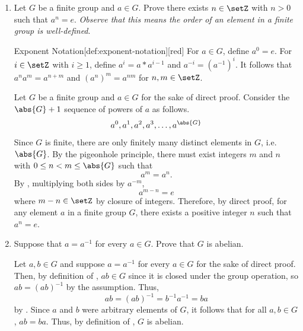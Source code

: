 \begin{enumerate}
  \newpage
  \item Let $G$ be a finite group and $a \in G$. 
  Prove there exists $n \in \setZ$ with $n>0$ such that $a^n=e$.
  \textit{Observe that this means the order of an element in a finite group is well-defined}.
  \begin{define}{Exponent Notation}[def:exponent-notation][red]
    For $a \in G$, define $a^0=e$. 
    For $i \in \setZ$ with $i \geq 1$, 
    define $a^i=a * a^{i-1}$ and $a^{-i}=\left(a^{-1}\right)^i$. 
    It follows that $a^n a^m=a^{n+m}$ and $\left(a^n\right)^m=a^{n m}$ for $n, m \in \setZ$.
  \end{define}
  \begin{subprove}
    Let $G$ be a finite group and $a \in G$ for the sake of direct proof.
    Consider the $\abs{G} + 1$ sequence of powers of $a$ as follows.
    \[
      a^0, a^1, a^2, a^3, \ldots, a^{\abs{G}}
    \]
    Since $G$ is finite, there are only finitely many distinct elements in $G$, i.e. $\abs{G}$.
    By the pigeonhole principle, there must exist integers $m$ and $n$ with $0 \leq n < m \leq \abs{G}$ such that
    \[
      a^m = a^n.
    \]
    By , multiplying both sides by $a^{-m}$,
    \[
      a^{m-n} = e
    \]
    where $m-n \in \setZ$ by closure of integers.
    Therefore, by direct proof, for any element $a$ in a finite group $G$, 
    there exists a positive integer $n$ such that $a^n = e$.
  \end{subprove}
  \item Suppose that $a=a^{-1}$ for every $a \in G$. 
  Prove that $G$ is abelian.
  \begin{subprove}
    Let $a, b \in G$ and suppose $a=a^{-1}$ for every $a \in G$ for the sake of direct proof.
    Then, by definition of , $ab \in G$ since it is closed under 
    the group operation, so $ab=(ab)^{-1}$ by the assumption. Thus,
    \[
      ab = (a b)^{-1} = b^{-1} a^{-1} = b a
    \]
    by .
    Since $a$ and $b$ were arbitrary elements of $G$, 
    it follows that for all $a, b \in G$, $a b = b a$.
    Thus, by definition of , $G$ is abelian.
  \end{subprove}











\end{enumerate}
